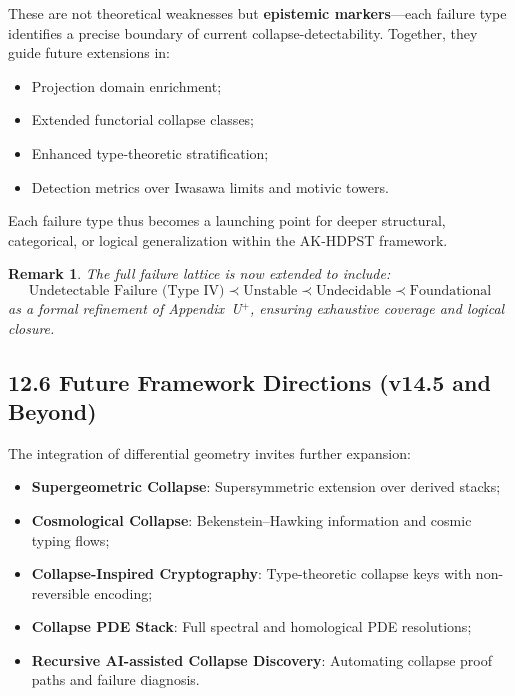 \documentclass[11pt]{article}
\newtheorem{remark}[theorem]{Remark}
\begin{document}
\vspace{1em}
These are not theoretical weaknesses but \textbf{epistemic markers}—each failure type identifies a precise boundary of current collapse-detectability. Together, they guide future extensions in:

\begin{itemize}
  \item Projection domain enrichment;
  \item Extended functorial collapse classes;
  \item Enhanced type-theoretic stratification;
  \item Detection metrics over Iwasawa limits and motivic towers.
\end{itemize}

Each failure type thus becomes a launching point for deeper structural, categorical, or logical generalization within the AK-HDPST framework.

\begin{remark}
The full failure lattice is now extended to include:
\[
\boxed{
\text{Undetectable Failure (Type IV)} \prec 
\text{Unstable} \prec 
\text{Undecidable} \prec 
\text{Foundational}
}
\]
as a formal refinement of Appendix~U$^+$, ensuring exhaustive coverage and logical closure.
\end{remark}

\subsection*{12.6 Future Framework Directions (v14.5 and Beyond)}

The integration of differential geometry invites further expansion:

\begin{itemize}
    \item \textbf{Supergeometric Collapse}: Supersymmetric extension over derived stacks;
    \item \textbf{Cosmological Collapse}: Bekenstein–Hawking information and cosmic typing flows;
    \item \textbf{Collapse-Inspired Cryptography}: Type-theoretic collapse keys with non-reversible encoding;
    \item \textbf{Collapse PDE Stack}: Full spectral and homological PDE resolutions;
    \item \textbf{Recursive AI-assisted Collapse Discovery}: Automating collapse proof paths and failure diagnosis.
\end{itemize}
\end{document}
